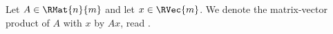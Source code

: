 



Let $A \in \RMat{n}{m}$ and let $x \in \RVec{m}$. We denote the matrix-vector product of $A$ with $x$ by $Ax$, read .

